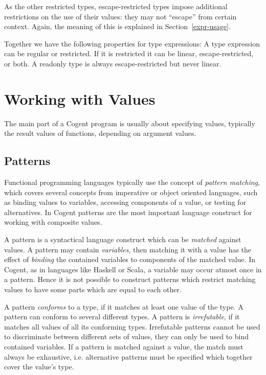 \documentclass[a4paper]{report}
\newcommand{\cogent}{Cogent\xspace}
\begin{document}
As the other restricted types, escape-restricted types impose additional restrictions on the use of their values: they 
may not ``escape'' from certain context. Again, the meaning of this is explained in Section~\ref{expr-usage}.

Together we have the following properties for type expressions: A type expression can be regular or restricted. If it is restricted 
it can be linear, escape-restricted, or both. A readonly type is always escape-restricted but never linear.

\chapter{Working with Values}

The main part of a \cogent program is usually about specifying values, typically the result values of functions, depending on argument values. 

\section{Patterns}

Functional programming languages typically use the concept of \textit{pattern matching}, which covers several concepts from imperative or 
object oriented languages, such as binding values to variables, accessing components of a value, or testing for alternatives. In \cogent 
patterns are the most important language construct for working with composite values.

A pattern is a syntactical language construct which can be \textit{matched} against values. A pattern may contain \textit{variables}, 
then matching it with a value has the effect of \textit{binding} the contained variables to components of the matched value. In \cogent, 
\cbstart as \cbend in languages like Haskell or Scala, a variable may occur atmost once in a pattern. Hence it is not possible to construct patterns 
which restrict matching values to have some parts which are equal to each other.

A pattern \textit{conforms} to a type, if it matches at least one value of the type. A pattern can conform to several different types. 
A pattern is \textit{irrefutable}, if it matches all values of all its conforming types. Irrefutable patterns cannot be used to discriminate 
between different sets of values, they can only be used to bind contained variables. \cbstart If a pattern is matched
against a value, the match must always be exhaustive, i.e. alternative patterns must be specified which together cover
the value's type. \cbend
\end{document}

